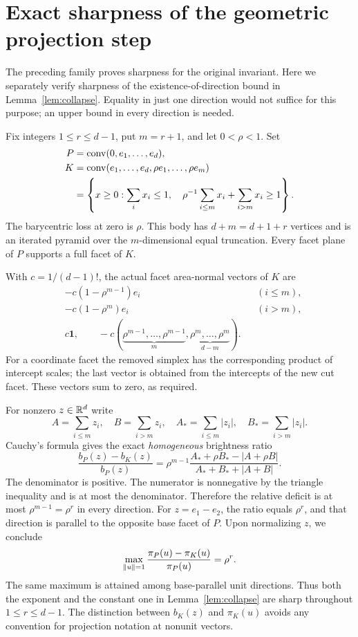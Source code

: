 \section{Exact sharpness of the geometric projection step}
\label{sec:geometricsharp}
The preceding family proves sharpness for the original invariant.
Here we separately verify sharpness of the existence-of-direction bound
in Lemma~\ref{lem:collapse}. Equality in just one direction would not
suffice for this purpose; an upper bound in every direction is needed.

Fix integers $1\le r\le d-1$, put $m=r+1$, and let $0<\rho<1$. Set
\begin{align*}
 P&=\operatorname{conv}(0,e_1,\ldots,e_d),\\
 K&=\operatorname{conv}(e_1,\ldots,e_d,\rho e_1,\ldots,\rho e_m)\\
  &=\left\{x\ge0:\sum_i x_i\le1,\quad
       \rho^{-1}\sum_{i\le m}x_i+\sum_{i>m}x_i\ge1\right\}.
\end{align*}
The barycentric loss at zero is $\rho$. This body has $d+m=d+1+r$
vertices and is an iterated pyramid over the $m$-dimensional equal
truncation. Every facet plane of $P$ supports a full facet of $K$.

With $c=1/(d-1)!$, the actual facet area-normal vectors of $K$ are
\begin{align*}
 &-c(1-\rho^{m-1})e_i &&(i\le m),\\
 &-c(1-\rho^m)e_i &&(i>m),\\
 &c\mathbf1,\qquad
 -c(\underbrace{\rho^{m-1},\ldots,\rho^{m-1}}_{m},
       \underbrace{\rho^m,\ldots,\rho^m}_{d-m}).
\end{align*}
For a coordinate facet the removed simplex has the corresponding product
of intercept scales; the last vector is obtained from the intercepts of
the new cut facet. These vectors sum to zero, as required.

For nonzero $z\in\mathbb R^d$ write
\[
 A=\sum_{i\le m}z_i,\quad B=\sum_{i>m}z_i,\quad
 A_* =\sum_{i\le m}|z_i|,\quad B_* =\sum_{i>m}|z_i|.
\]
Cauchy's formula gives the exact \emph{homogeneous} brightness ratio
\begin{equation}\label{eq:sharpbrightness}
 \frac{b_P(z)-b_K(z)}{b_P(z)}
 =\rho^{m-1}\frac{A_*+\rho B_*-|A+\rho B|}
                         {A_*+B_*+|A+B|}.
\end{equation}
The denominator is positive. The numerator is nonnegative by the triangle
inequality and is at most the denominator. Therefore the relative deficit
is at most $\rho^{m-1}=\rho^r$ in every direction. For
$z=e_1-e_2$, the ratio equals $\rho^r$, and that direction is parallel to
the opposite base facet of $P$. Upon normalizing $z$, we conclude
\begin{equation}\label{eq:maxsharp}
 \max_{\lVert u\rVert=1}\frac{\pi_P(u)-\pi_K(u)}{\pi_P(u)}=\rho^r.
\end{equation}
The same maximum is attained among base-parallel unit directions.
Thus both the exponent and the constant one in
Lemma~\ref{lem:collapse} are sharp throughout $1\le r\le d-1$.
The distinction between $b_K(z)$ and $\pi_K(u)$ avoids any convention for
projection notation at nonunit vectors.
